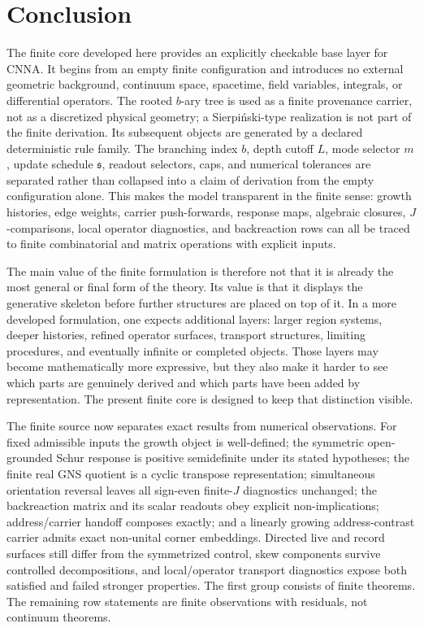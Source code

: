 \documentclass[11pt]{article}
\theoremstyle{remark}
\numberwithin{equation}{section}
\begin{document}
\newpage

\section{Conclusion}
The finite core developed here provides an explicitly checkable base layer for CNNA. It begins from an empty finite configuration and introduces no external geometric background, continuum space, spacetime, field variables, integrals, or differential operators. The rooted $b$-ary tree is used as a finite provenance carrier, not as a discretized physical geometry; a Sierpi\'nski-type realization is not part of the finite derivation. Its subsequent objects are generated by a declared deterministic rule family. The branching index \(b\), depth cutoff \(L\), mode selector \(m\), update schedule \(\mathfrak{s}\), readout selectors, caps, and numerical tolerances are separated rather than collapsed into a claim of derivation from the empty configuration alone. This makes the model transparent in the finite sense: growth histories, edge weights, carrier push-forwards, response maps, algebraic closures, \(J\)-comparisons, local operator diagnostics, and backreaction rows can all be traced to finite combinatorial and matrix operations with explicit inputs.

The main value of the finite formulation is therefore not that it is already the most general or final form of the theory. Its value is that it displays the generative skeleton before further structures are placed on top of it. In a more developed formulation, one expects additional layers: larger region systems, deeper histories, refined operator surfaces, transport structures, limiting procedures, and eventually infinite or completed objects. Those layers may become mathematically more expressive, but they also make it harder to see which parts are genuinely derived and which parts have been added by representation. The present finite core is designed to keep that distinction visible.

The finite source now separates exact results from numerical observations. For fixed admissible inputs the growth object is well-defined; the symmetric open-grounded Schur response is positive semidefinite under its stated hypotheses; the finite real GNS quotient is a cyclic transpose representation; simultaneous orientation reversal leaves all sign-even finite-\(J\) diagnostics unchanged; the backreaction matrix and its scalar readouts obey explicit non-implications; address/carrier handoff composes exactly; and a linearly growing address-contrast carrier admits exact non-unital corner embeddings. Directed live and record surfaces still differ from the symmetrized control, skew components survive controlled decompositions, and local/operator transport diagnostics expose both satisfied and failed stronger properties. The first group consists of finite theorems. The remaining row statements are finite observations with residuals, not continuum theorems.
\end{document}
